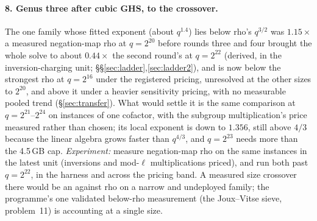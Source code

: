 \paragraph{8. Genus three after cubic GHS, to the crossover.} The one
family whose fitted exponent (about $q^{1.4}$) lies below rho's $q^{3/2}$ was
$1.15\times$ a measured negation-map rho at $q=2^{20}$ before rounds three
and four brought the whole solve to about $0.44\times$ the second round's
at $q=2^{22}$ (derived, in the inversion-charging unit;
\S\S\ref{sec:ladder},\ref{sec:ladder2}),
and is now below the strongest rho at $q=2^{16}$ under the registered
pricing, unresolved at the other sizes to $2^{20}$, and above it under a
heavier sensitivity pricing, with no measurable pooled trend
(\S\ref{sec:transfer}). What would settle it is the same comparison at
$q=2^{21}$--$2^{24}$ on instances of one cofactor, with the subgroup
multiplication's price measured rather than chosen;
its local exponent is down to $1.356$, still above $4/3$ because the linear
algebra grows faster than $q^{4/3}$, and $q=2^{23}$ needs more than the
4.5\,GB cap.
\emph{Experiment:} measure negation-map rho on the same instances in the
latest unit (inversions and mod-$\ell$ multiplications priced), and run
both past $q=2^{22}$, in the harness and across the pricing band. A measured
size crossover there would be an  against rho on a narrow and
undeployed family; the programme's one validated below-rho measurement
(the Joux--Vitse sieve, problem~11) is accounting at a single size.

